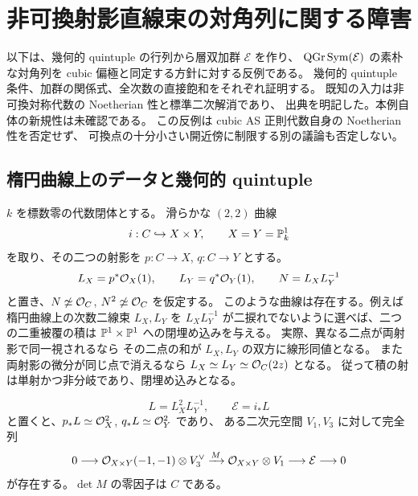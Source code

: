 \section{非可換射影直線束の対角列に関する障害}
\label{sec:ruled-diagonal-obstruction}

以下は、幾何的 quintuple の行列から層双加群 $\mathcal E$ を作り、
$\operatorname{QGr}\operatorname{Sym}(\mathcal E)$ の素朴な対角列を cubic 偏極と同定する方針に対する反例である。
幾何的 quintuple 条件、加群の関係式、全次数の直接飽和をそれぞれ証明する。
既知の入力は非可換対称代数の Noetherian 性と標準二次解消であり、
出典を明記した。本例自体の新規性は未確認である。
この反例は cubic AS 正則代数自身の Noetherian 性を否定せず、
可換点の十分小さい開近傍に制限する別の議論も否定しない。

\subsection{楕円曲線上のデータと幾何的 quintuple}

$k$ を標数零の代数閉体とする。
滑らかな $(2,2)$ 曲線
\[
 i:C\hookrightarrow X\times Y,\qquad X=Y=\mathbb P^1_k
\]
を取り、その二つの射影を $p:C\to X$, $q:C\to Y$ とする。
\[
 L_X=p^*\mathcal O_X(1),\qquad L_Y=q^*\mathcal O_Y(1),\qquad N=L_XL_Y^{-1}
\]
と置き、$N\not\simeq\mathcal O_C$, $N^2\not\simeq\mathcal O_C$ を仮定する。
このような曲線は存在する。例えば楕円曲線上の次数二線束 $L_X,L_Y$ を
$L_XL_Y^{-1}$ が二捩れでないように選べば、二つの二重被覆の積は
$\mathbb P^1\times\mathbb P^1$ への閉埋め込みを与える。
実際、異なる二点が両射影で同一視されるなら
その二点の和が $L_X,L_Y$ の双方に線形同値となる。
また両射影の微分が同じ点で消えるなら $L_X\simeq L_Y\simeq\mathcal O_C(2z)$ となる。
従って積の射は単射かつ非分岐であり、閉埋め込みとなる。

\begin{lemma}\label{ruled-lem:resolution}
\[
 L=L_X^2L_Y^{-1},\qquad \mathcal E=i_*L
\]
と置くと、$p_*L\simeq\mathcal O_X^2$, $q_*L\simeq\mathcal O_Y^2$ であり、
ある二次元空間 $V_1,V_3$ に対して完全列
\begin{equation}\label{ruled-eq:matrix-resolution}
 0\longrightarrow\mathcal O_{X\times Y}(-1,-1)\otimes V_3^\vee
 \xrightarrow{M}\mathcal O_{X\times Y}\otimes V_1
 \longrightarrow\mathcal E\longrightarrow0
\end{equation}
が存在する。$\det M$ の零因子は $C$ である。
\end{lemma}

